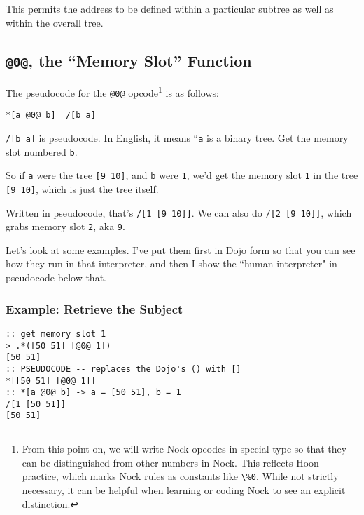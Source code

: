 \documentclass[twoside]{article}
\begin{document}
\noindent{}
This permits the address to be defined within a particular subtree as well as within the overall tree.

\subsection{\lstinline[style=inlinecode]{@0@}, the “Memory Slot” Function}
\label{sxn:nock0}

The pseudocode for the \lstinline[style=inlinecode]{@0@} opcode\footnote{From this point on, we will write Nock opcodes in special type so that they can be distinguished from other numbers in Nock.  This reflects Hoon practice, which marks Nock rules as constants like \lstinline[style=inlinecode]{\%0}.  While not strictly necessary, it can be helpful when learning or coding Nock to see an explicit distinction.} is as follows:

\begin{lstlisting}[style=listingcode]
*[a @0@ b]  /[b a]
\end{lstlisting}

\lstinline[style=inlinecode]{/[b a]} is pseudocode. In English, it means ``\lstinline[style=inlinecode]{a} is a binary tree. Get the memory slot numbered \lstinline[style=inlinecode]{b}.

So if \lstinline[style=inlinecode]{a} were the tree \lstinline[style=inlinecode]{[9 10]}, and \lstinline[style=inlinecode]{b} were \lstinline[style=inlinecode]{1}, we'd get the memory slot \lstinline[style=inlinecode]{1} in the tree \lstinline[style=inlinecode]{[9 10]}, which is just the tree itself.

Written in pseudocode, that's \lstinline[style=inlinecode]{/[1 [9 10]]}. We can also do \lstinline[style=inlinecode]{/[2 [9 10]]}, which grabs memory slot \lstinline[style=inlinecode]{2}, aka \lstinline[style=inlinecode]{9}.

Let's look at some examples. I've put them first in Dojo form so that you can see how they run in that interpreter, and then I show the ``human interpreter" in pseudocode below that.

\subsubsection{Example:  Retrieve the Subject}

\begin{lstlisting}[style=listingcode]
:: get memory slot 1
> .*([50 51] [@0@ 1])
[50 51]
:: PSEUDOCODE -- replaces the Dojo's () with []
*[[50 51] [@0@ 1]]
:: *[a @0@ b] -> a = [50 51], b = 1
/[1 [50 51]]
[50 51]
\end{lstlisting}
\end{document}
